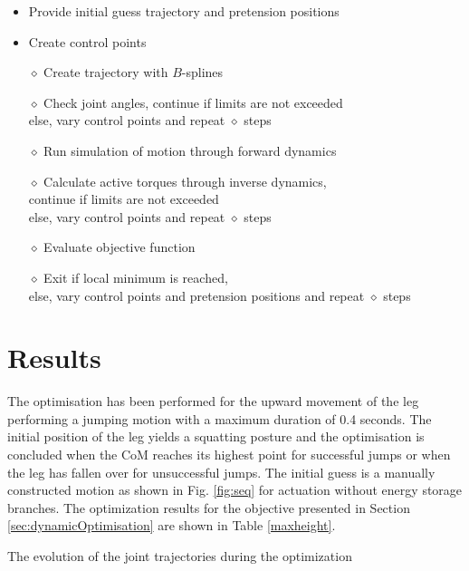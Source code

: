 \documentclass[letterpaper, 10 pt, conference]{ieeeconf}  %
\begin{document}
\begin{itemize}
	\item Provide initial guess trajectory and pretension positions
	\item Create control points\\
	\item[$\diamond$] Create trajectory with $B$-splines
	\item[$\diamond$] Check joint angles, continue if limits are not exceeded \\else, vary control points and repeat $\diamond$ steps
	\item[$\diamond$] Run simulation of motion through forward dynamics
	\item[$\diamond$] Calculate active torques through inverse dynamics,\\ continue if limits are not exceeded \\else, vary control points and repeat $\diamond$ steps
	\item[$\diamond$] Evaluate objective function\\
	\item[$\diamond$] Exit if local minimum is reached, \\ else, vary control points and pretension positions and repeat $\diamond$ steps
\end{itemize}

\section{Results} \label{sec:results}

The optimisation has been performed for the upward movement of the leg performing a jumping motion with a maximum duration of 0.4 seconds. The initial position of the leg yields a squatting posture and the optimisation is concluded when the CoM reaches its highest point for successful jumps or when the leg has fallen over for unsuccessful jumps. The initial guess is a manually constructed motion as shown in Fig. \ref{fig:seq} for actuation without energy storage branches. The optimization results for the objective presented in Section \ref{sec:dynamicOptimisation} are shown in Table \ref{maxheight}.





The evolution of the joint trajectories during the optimization 
\end{document}
